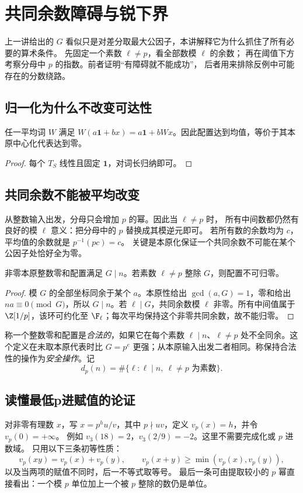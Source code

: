 \chapter{共同余数障碍与锐下界}\label{sec:obstruction}

上一讲给出的 $G$ 看似只是对差分取最大公因子，本讲解释它为什么抓住了所有必要的算术条件。
先固定一个素数 $\ell\ne p$，看全部数模 $\ell$ 的余数；
再在阈值下方考察分母中 $p$ 的指数。前者证明“有障碍就不能成功”，
后者用来排除反例中可能存在的分数绕路。
\section{归一化为什么不改变可达性}

\begin{lemma}[归一化与操作序列相容]\label{lem:affine}
任一平均词 $W$ 满足 $W(a\mathbf1+bx)=a\mathbf1+bWx$。因此配置达到均值，等价于其本原中心化代表达到零。
\end{lemma}
\begin{proof}
每个 $T_S$ 线性且固定 $\mathbf1$，对词长归纳即可。
\end{proof}


\section{共同余数不能被平均改变}
从整数输入出发，分母只会增加 $p$ 的幂。因此当 $\ell\ne p$ 时，
所有中间数都仍然有良好的模 $\ell$ 意义：把分母中的 $p$ 替换成其模逆元即可。
若所有数的余数均为 $c$，平均值的余数就是 $p^{-1}(pc)=c$。
关键是本原化保证一个共同余数不可能在某个公因子处恰好全为零。

\begin{lemma}[非平均素数处的共同余数障碍]\label{lem:obstruction}
非零本原整数零和配置满足 $G\mid n$。若素数 $\ell\ne p$ 整除 $G$，则配置不可归零。
\end{lemma}
\begin{proof}
模 $G$ 的全部坐标同余于某个 $a$。本原性给出 $\gcd(a,G)=1$，零和给出 $na\equiv0\pmod G$，所以 $G\mid n$。若 $\ell\mid G$，共同余数模 $\ell$ 非零。所有中间值属于 $\Z[1/p]$，该环可约化至 $\F_\ell$；每次平均保持这个非零共同余数，故不能归零。
\end{proof}

称一个整数零和配置是\emph{合法的}，如果它在每个素数 $\ell\mid n$、$\ell\ne p$ 处不全同余。这个定义在未取本原代表时比 $G=p^e$ 更强；从本原输入出发二者相同。称保持合法性的操作为\emph{安全操作}。记
\[
d_p(n)=\#\{\ell:\ell\mid n,\ \ell\ne p\text{ 为素数}\}.
\]


\section{读懂最低p进赋值的论证}
对非零有理数 $x$，写 $x=p^h u/v$，其中 $p\nmid uv$，定义 $v_p(x)=h$，并令 $v_p(0)=+\infty$。
例如 $v_3(18)=2$，$v_3(2/9)=-2$。这里不需要完成化或 $p$ 进数域。
只用以下三条初等性质：
\[
v_p(xy)=v_p(x)+v_p(y),\qquad
v_p(x+y)\ge\min(v_p(x),v_p(y)),
\]
以及当两项的赋值不同时，后一不等式取等号。
最后一条可由提取较小的 $p$ 幂直接看出：一个模 $p$ 单位加上一个被 $p$ 整除的数仍是单位。

